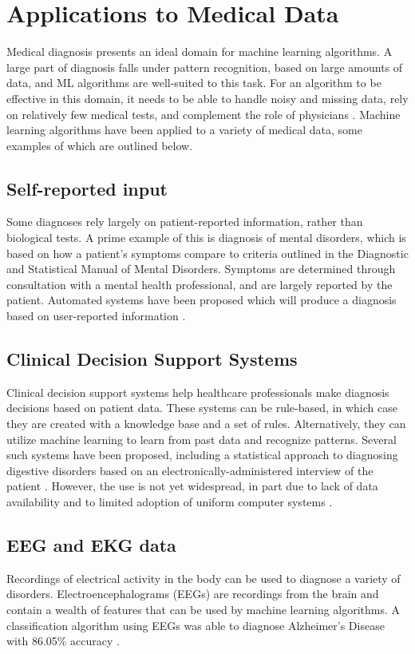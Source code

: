 \documentclass[draftcopy]{srpaper}
\begin{document}
\section{Applications to Medical Data}
Medical diagnosis presents an ideal domain for machine learning
algorithms. A large part of diagnosis falls under pattern recognition,
based on large amounts of data, and ML algorithms are well-suited to
this task. For an algorithm to be effective in this domain, it needs to be able to handle noisy and missing
data, rely on relatively few medical tests, and complement the role of
physicians \cite{Kon01}.
Machine learning algorithms have been applied to a variety of medical
data, some examples of which are outlined below.

\subsection{Self-reported input}
Some diagnoses rely largely on patient-reported information, rather than
biological tests. A prime example of this is diagnosis of mental disorders,
which is based on how a patient's symptoms compare to criteria
outlined in the Diagnostic and Statistical Manual of Mental
Disorders. Symptoms are determined through consultation with a mental
health professional, and are largely reported by the
patient. Automated systems
have been proposed which will produce a diagnosis based on
user-reported information \cite{yap1996}.

\subsection{Clinical Decision Support Systems}
Clinical decision support systems help healthcare professionals make
diagnosis decisions based on patient data. These systems can be
rule-based, in which case they are created with a knowledge base and
a set of rules. Alternatively, they can utilize machine learning to
learn from past data and recognize patterns. Several such
systems have been proposed, including a statistical approach to
diagnosing digestive disorders based on an electronically-administered interview of the
patient \cite{SK84}. However, the use is not yet widespread, in part
due to lack of data availability and to limited adoption of uniform
computer systems \cite{Greenes2007}.

\subsection{EEG and EKG data}
Recordings of electrical activity in the body can be used to diagnose a variety of
disorders. Electroencephalograms (EEGs) are recordings from the brain
and contain a wealth of features that can be used by machine learning
algorithms. A classification algorithm using EEGs was able to diagnose
Alzheimer's Disease with 86.05\% accuracy \cite{Pod12}.
\end{document}
